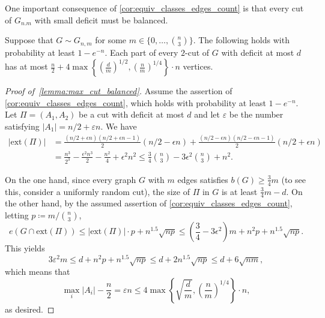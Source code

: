 \documentclass[11pt,a4paper,oneside,reqno]{amsart}
\newcommand{\1}{\mathbbm{1}} %
\newcommand{\eps}{\varepsilon}
\renewcommand{\le}{\leqslant}
\renewcommand{\ge}{\geqslant}
\newcommand{\ext}{\mathrm{ext}}
\begin{document}
One important consequence of \ref{cor:equiv_classes_edges_count} is that every cut of $G_{n. m}$ with small deficit must be balanced.

\begin{lemma}\label{lemma:max_cut_balanced}
  Suppose that $G \sim G_{n, m}$ for some $m \in \{0, \dotsc, \binom{n}{3}\}$.
  The following holds with probability at least $1-e^{-n}$. Each part of every $2$-cut of $G$ with deficit at most $d$ has at most $\frac{n}{2}+4\max\left\{\left(\frac{d}{m}\right)^{1/2}, \left(\frac{n}{m}\right)^{1/4}\right\} \cdot n$ vertices.
\end{lemma}


\begin{proof}[Proof of~\ref{lemma:max_cut_balanced}]
  Assume the assertion of \ref{cor:equiv_classes_edges_count}, which holds with probability at least $1-e^{-n}$.
  Let $\Pi = (A_1, A_2)$ be a cut with deficit at most $d$ and let $\eps$ be the number satisfying $|A_1| = n/2+\eps n$. We have\begin{align*}
    |\ext(\Pi)| &= \frac{(n/2 + \epsilon n)(n/2 + \epsilon n - 1)}{2}(n/2 - \epsilon n) + \frac{(n/2 - \epsilon n)(n/2 - \epsilon n - 1)}{2}(n/2 + \epsilon n) \\
    &= \frac{n^3}{2^3} - \frac{\epsilon^2 n^3}{2} - \frac{n^2}{4} + \epsilon^2 n^2 \le \frac{3}{4} \binom{n}{3} - 3 \epsilon^2 \binom{n}{3} + n^2.
  \end{align*}  

  On the one hand, since every graph $G$ with $m$ edges satisfies $b(G) \ge \frac{3}{4} m$ (to see this, consider a uniformly random cut), the size of $\Pi$ in $G$ is at least $\frac{3}{4} m - d$.
  On the other hand, by the assumed assertion of \ref{cor:equiv_classes_edges_count}, letting $p \coloneqq m / \binom{n}{3}$,
  \[
    e(G \cap \ext(\Pi)) \le |\ext(\Pi)| \cdot p + n^{1.5}\sqrt{np} \le \left(\frac{3}{4} - 3 \epsilon^2 \right) m + n^2 p + n^{1.5}\sqrt{np}.
  \]
  This yields
  \[
    3\eps^2m \le d + n^2 p + n^{1.5}\sqrt{np} \le d + 2 n^{1.5}\sqrt{np} \le d + 6\sqrt{nm},
  \]
  which means that
  \[
    \max_i |A_i| - \frac{n}{2} = \eps n \le 4\max\left\{\sqrt{\frac{d}{m}}, \left(\frac{n}{m}\right)^{1/4}\right\} \cdot n,
  \]
  as desired.
\end{proof}
\end{document}
